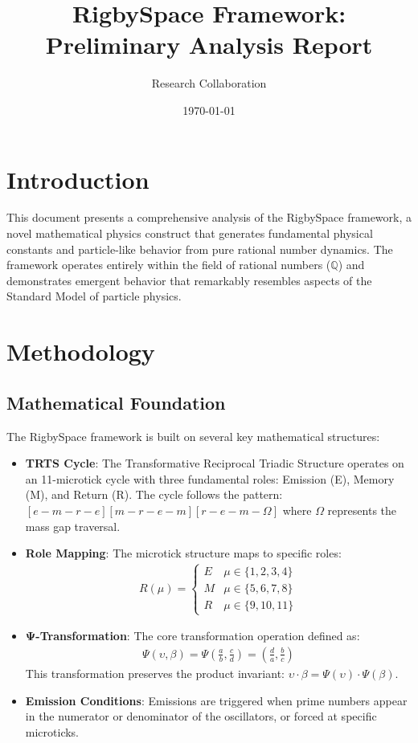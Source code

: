 \documentclass[12pt]{article}
\title{RigbySpace Framework: Preliminary Analysis Report}
\author{Research Collaboration}
\date{\today}
\begin{document}
\maketitle

\section{Introduction}

This document presents a comprehensive analysis of the RigbySpace framework, a novel mathematical physics construct that generates fundamental physical constants and particle-like behavior from pure rational number dynamics. The framework operates entirely within the field of rational numbers ($\mathbb{Q}$) and demonstrates emergent behavior that remarkably resembles aspects of the Standard Model of particle physics.

\section{Methodology}

\subsection{Mathematical Foundation}

The RigbySpace framework is built on several key mathematical structures:

\begin{itemize}
\item \textbf{TRTS Cycle}: The Transformative Reciprocal Triadic Structure operates on an 11-microtick cycle with three fundamental roles: Emission (E), Memory (M), and Return (R). The cycle follows the pattern: $[e - m - r - e][m - r - e - m][r - e - m - \Omega]$ where $\Omega$ represents the mass gap traversal.

\item \textbf{Role Mapping}: The microtick structure maps to specific roles:
\begin{align*}
R(\mu) = 
\begin{cases}
E & \mu \in \{1, 2, 3, 4\} \\
M & \mu \in \{5, 6, 7, 8\} \\
R & \mu \in \{9, 10, 11\}
\end{cases}
\end{align*}

\item \textbf{Ψ-Transformation}: The core transformation operation defined as:
\begin{align*}
\Psi(\upsilon, \beta) = \Psi\left(\frac{a}{b}, \frac{c}{d}\right) = \left(\frac{d}{a}, \frac{b}{c}\right)
\end{align*}
This transformation preserves the product invariant: $\upsilon \cdot \beta = \Psi(\upsilon) \cdot \Psi(\beta)$.

\item \textbf{Emission Conditions}: Emissions are triggered when prime numbers appear in the numerator or denominator of the oscillators, or forced at specific microticks.
\end{itemize}
\end{document}
